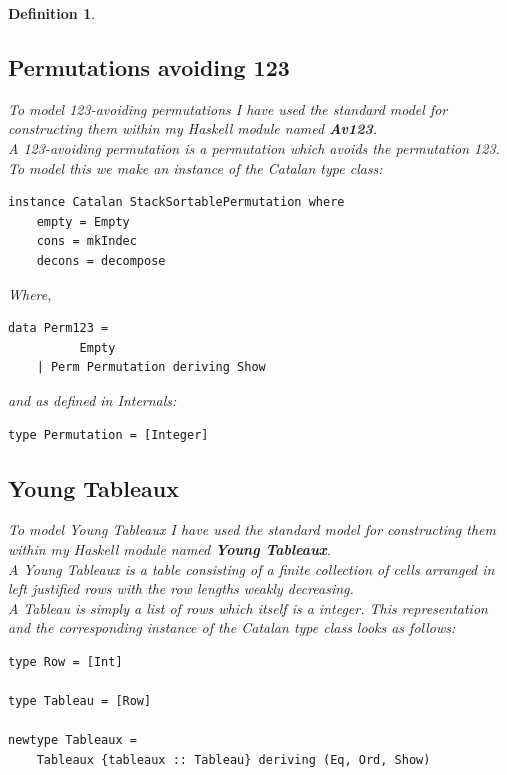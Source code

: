 \documentclass[12pt]{article}
\newtheorem{definition}{Definition}
\begin{document}
\begin{definition}
\subsection {Permutations avoiding 123}
To model 123-avoiding permutations I have used the standard model for constructing them within my Haskell module named {\bf Av123}.\\
A 123-avoiding permutation is a permutation which avoids the permutation 123.  To model this we make an instance of the Catalan type class:
\begin{lstlisting}
instance Catalan StackSortablePermutation where
	empty = Empty	
	cons = mkIndec
	decons = decompose
\end{lstlisting}
Where, 
\begin{lstlisting}
data Perm123 = 
          Empty 
	| Perm Permutation deriving Show
\end{lstlisting}
and as defined in Internals:
\begin{lstlisting}
type Permutation = [Integer]
\end{lstlisting}
\subsection{Young Tableaux}
To model Young Tableaux I have used the standard model for constructing them within my Haskell module named {\bf Young Tableaux}.\\
A Young Tableaux is a table consisting of a finite collection of cells arranged in left justified rows with the row lengths weakly decreasing.\\
A Tableau is simply a list of rows which itself is a integer. This representation and the corresponding instance of the Catalan type class looks as follows:
\begin{lstlisting}
type Row = [Int]

type Tableau = [Row]

newtype Tableaux = 
	Tableaux {tableaux :: Tableau} deriving (Eq, Ord, Show)


\end{lstlisting}
\end{definition}
\end{document}
